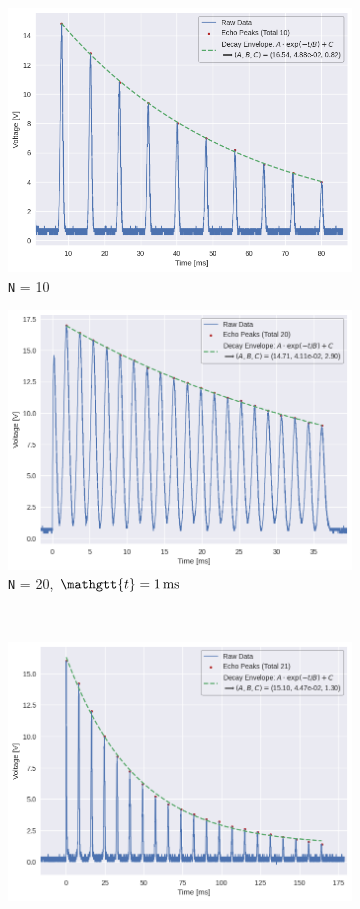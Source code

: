 \documentclass[%
 reprint,
 amsmath,amssymb,
 aps,
]{revtex4-2}
\newcommand{\taucode}{\mathgtt{t}}
\begin{document}
\begin{figure}[hbpt]
    \centering
    \begin{subfigure}{0.3\linewidth}
        \includegraphics[width = 0.8\linewidth]{figs/purcell/data2.png}
        \caption{\texttt{N} = 10}
    \end{subfigure}
    \begin{subfigure}{0.3\linewidth}
        \includegraphics[width = 0.8\linewidth]{figs/purcell/data3.png}
        \caption{\texttt{N} = 20, $\taucode = \SI{1}{\milli\second}$}
    \end{subfigure}\\
    \begin{subfigure}{0.3\linewidth}
        \includegraphics[width = 0.8\linewidth]{figs/purcell/data1.png}

\end{subfigure}
\end{figure}
\end{document}
